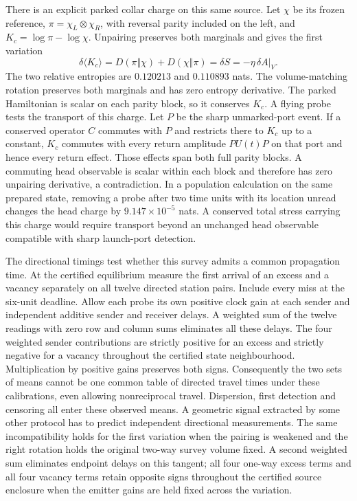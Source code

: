 \documentclass[11pt]{article}
\begin{document}
There is an explicit parked collar charge on this same source. Let
$\chi$ be its frozen reference, $\pi=\chi_L\otimes\chi_R$, with reversal
parity included on the left, and $K_c=\log\pi-\log\chi$. Unpairing
preserves both marginals and gives the first variation
\[
 \delta\langle K_c\rangle
 =D(\pi\Vert\chi)+D(\chi\Vert\pi)
 =\delta S=-\eta\,\delta A|_V .
\]
The two relative entropies are $0.120213$ and $0.110893$ nats.
The volume-matching rotation preserves both marginals and has zero
entropy derivative. The parked Hamiltonian is scalar on each parity
block, so it conserves $K_c$. A flying probe tests the transport of
this charge. Let $P$ be the sharp unmarked-port event. If a conserved
operator $C$ commutes with $P$ and restricts there to $K_c$ up to a
constant, $K_c$ commutes with every return amplitude $P U(t)P$ on
that port and hence every return effect. Those effects span both full
parity blocks. A commuting head observable is scalar within each block
and therefore has zero unpairing derivative, a contradiction. In a
population calculation on the same prepared state, removing a probe
after two time units with its location unread changes the head charge
by $9.147\times10^{-5}$ nats. A conserved total stress carrying this
charge would require transport beyond an unchanged head observable
compatible with sharp launch-port detection.

The directional timings test whether this survey admits a common
propagation time. At the certified equilibrium measure the first arrival
of an excess and a vacancy separately on all twelve directed station
pairs. Include every miss at the six-unit deadline. Allow each probe
its own positive clock gain at each sender and independent additive
sender and receiver delays. A weighted sum of the twelve readings
with zero row and column sums eliminates all these delays. The four
weighted sender contributions are strictly positive for an excess and
strictly negative for a vacancy throughout the certified state
neighbourhood. Multiplication by positive gains preserves both signs.
Consequently the two sets of means cannot be one common table of
directed travel times under these calibrations, even allowing
nonreciprocal travel. Dispersion, first detection and censoring all
enter these observed means. A geometric signal extracted by some
other protocol has to predict independent directional measurements. The
same incompatibility holds for the first variation when the pairing is
weakened and the right rotation holds the original two-way survey volume
fixed. A second weighted sum eliminates endpoint delays on this tangent;
all four one-way excess terms and all four vacancy terms retain
opposite signs throughout the certified source enclosure when the
emitter gains are held fixed across the variation.
\end{document}
